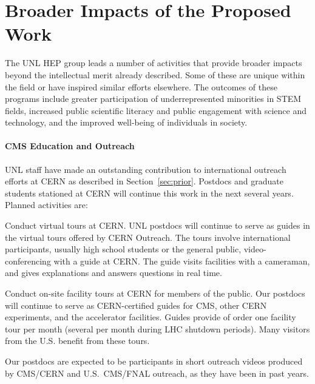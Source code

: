 \section{Broader Impacts of the Proposed Work}

The UNL HEP group leads a number of activities that provide broader impacts beyond the intellectual merit already described. Some of these are unique within the field or have inspired similar efforts elsewhere. The outcomes of these programs include  greater participation of underrepresented minorities in STEM fields, increased public scientific literacy and public engagement with science and technology, and the improved well-being of individuals in society.

\paragraph{CMS Education and Outreach}
UNL staff have made an outstanding contribution to international outreach
efforts at CERN as described in Section~\ref{sec:prior}.
Postdocs and graduate students stationed at CERN will continue this work in the
next several years. Planned activities are:
\begin{packed_itemize}

     \item Conduct virtual tours at CERN.  UNL
   	postdocs will continue to serve as guides in the virtual tours offered by CERN
       Outreach. The tours involve international participants, usually high school
       students or the general public, video-conferencing with a guide at CERN.
       The guide visits facilities with a cameraman, and gives
       explanations and answers questions in real time.

     \item Conduct on-site facility tours at CERN for members of the public. Our postdocs will continue to serve as CERN-certified guides for CMS,
       other CERN experiments, and the accelerator facilities. Guides provide of order one facility tour per month (several per month during
       LHC shutdown periods). Many visitors from the U.S. benefit from these tours.

   \item Our postdocs are expected to be participants in short outreach videos
       produced by CMS/CERN and U.S.~CMS/FNAL outreach, as they have been in past years.
\end{packed_itemize}

